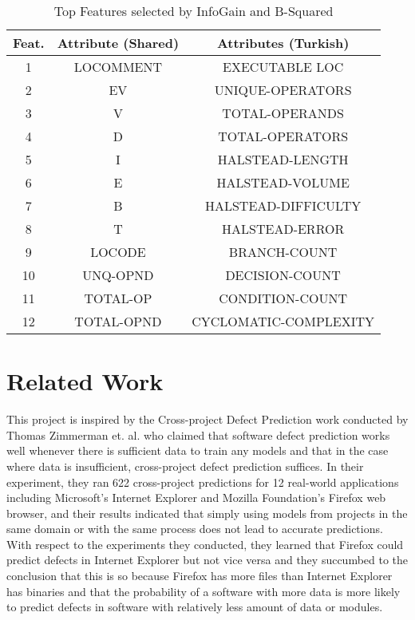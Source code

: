 \documentclass{sig-alternate}
\begin{document}
\begin{table}[h] 
\centering 
\caption{Top Features selected by InfoGain and B-Squared} 
\begin{tabular}{|c|c|c|} \hline 
Feat.&Attribute (Shared)&Attributes (Turkish)\\\hline 
1& LOCOMMENT & EXECUTABLE LOC\\ \hline 
2& EV & UNIQUE-OPERATORS\\ \hline 
3& V & TOTAL-OPERANDS\\ \hline 
4& D & TOTAL-OPERATORS\\ \hline 
5& I & HALSTEAD-LENGTH\\ \hline 
6& E & HALSTEAD-VOLUME\\ \hline 
7& B & HALSTEAD-DIFFICULTY\\ \hline 
8& T & HALSTEAD-ERROR\\ \hline 
9& LOCODE & BRANCH-COUNT\\ \hline 
10& UNQ-OPND & DECISION-COUNT\\ \hline 
11& TOTAL-OP & CONDITION-COUNT\\ \hline 
12& TOTAL-OPND & CYCLOMATIC-COMPLEXITY\\ \hline 
 
\hline\end{tabular} 
\end{table} 
 
 
\section{Related Work} 
This project is inspired by the Cross-project Defect Prediction work conducted by Thomas Zimmerman et. al. who claimed that software defect prediction works well whenever there is sufficient data to train any models and that in the case where data is insufficient, cross-project defect prediction suffices\cite{zimmerman09}. In their experiment, they ran 622 cross-project predictions for 12 real-world applications including Microsoft's Internet Explorer and Mozilla Foundation's Firefox web browser, and their results indicated that simply using models from projects in the same domain or with the same process does not lead to accurate predictions. With respect to the experiments they conducted, they learned that Firefox could predict defects in Internet Explorer but not vice versa and they succumbed to the conclusion that this is so because Firefox has more files than Internet Explorer has binaries and that the probability of a software with more data is more likely to predict defects in software with relatively less amount of data or modules.  
 
\end{document}
